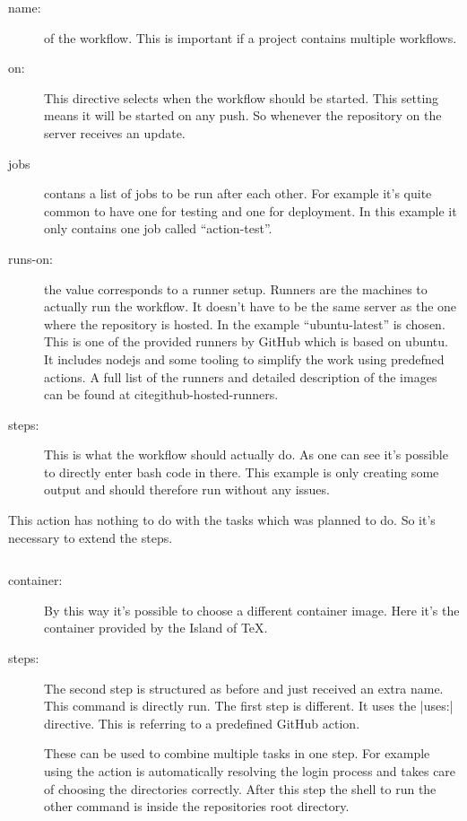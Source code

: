 \documentclass[final]{ltugboat}
\newcommand*{\TeXLive}{\acro{\TeX\,Live}}
\begin{document}
\begin{description}
\item[name:] of the workflow.
This is important if a project contains multiple workflows.

\item[on:] This directive selects when the workflow should be started.
This setting means it will be started on any push. So whenever the repository on the server receives an update.

\item[jobs] contans a list of jobs to be run after each other.
For example it's quite common to have one for testing and one for deployment.
In this example it only contains one job called \enquote{action-test}.

\item[runs-on:] the value corresponds to a runner setup.
Runners are the machines to actually run the workflow.
It doesn't have to be the same server as the one where the repository is hosted.
In the example \enquote{ubuntu-latest} is chosen.
This is one of the provided runners by GitHub which is based on ubuntu.
It includes nodejs and some tooling to simplify the work using predefned actions.
A full list of the runners and detailed description of the images can be found at cite{github-hosted-runners}.

\item[steps:] This is what the workflow should actually do.
As one can see it's possible to directly enter bash code in there.
This example is only creating some output and should therefore run without any issues.
\end{description}

This action has nothing to do with the tasks which was planned to do.
So it's necessary to extend the steps.

\inputminted[linenos,firstline=5]{yaml}{examples/latex-basic.yml}

\begin{description}
\item[container:] By this way it's possible to choose a different container image. Here it's the \TeXLive{} container provided by the Island of \TeX.
\item[steps:] The second step is structured as before and just received an extra name. This command is directly run. The first step is different. It uses the |uses:| directive. This is referring to a predefined GitHub action\cite{action/checkout}.

These can be used to combine multiple tasks in one step. For example using the action is automatically resolving the login process and takes care of choosing the directories correctly. After this step the shell to run the other command is  inside the repositories root directory.
\end{description}
\end{document}
